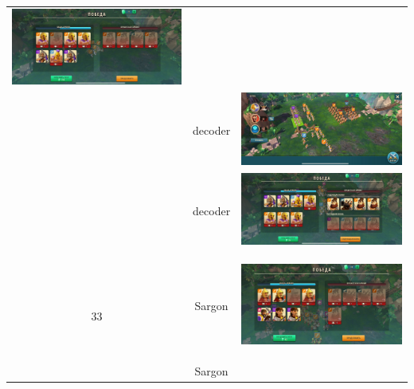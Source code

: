 \begin{longtable}{|c|c|c|}
	\includegraphics[width=0.75\linewidth]{./parts/media/TreasureHunt/32/decoder/photo_2022-04-07_10-01-57.jpg} \\
	& decoder &
	\includegraphics[width=0.75\linewidth]{./parts/media/TreasureHunt/32/decoder/photo_2022-04-07_10-01-54.jpg} \\
	& decoder &
	\includegraphics[width=0.75\linewidth]{./parts/media/TreasureHunt/32/decoder/photo_2022-04-07_10-01-48.jpg} \\
	\hline
	\multirow{8}{*}{33} & Sargon &
	\hypertarget{fight33}{\includegraphics[width=0.75\linewidth]{./parts/media/TreasureHunt/33/sargon/photo_2022-04-07_10-06-40.jpg}} \\
	& Sargon &

\end{longtable}
